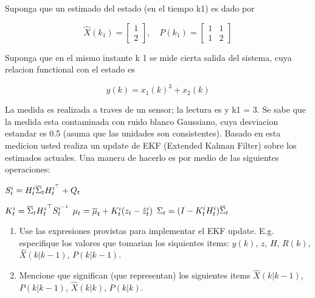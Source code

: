 \documentclass[parcial]{lcc}
\begin{document}
Suponga que un estimado del estado (en el tiempo k1) es dado por

\[ \hat{X}(k_1) = \begin{bmatrix} 1 \\ 2 \end{bmatrix}, \quad P(k_1) = \begin{bmatrix} 1 & 1 \\ 1 & 2 \end{bmatrix} \]

Suponga que en el mismo instante k 1 se mide cierta salida del sistema, cuya relacion functional con el estado es

\begin{equation*}
y(k) = x_1(k)^3 + x_2(k)
\end{equation*}

La medida es realizada a traves de un sensor; la lectura es y k1 = 3. Se sabe que la medida esta contaminada con ruido blanco Gaussiano, cuya desviacion estandar es 0.5 (asuma que las unidades son consistentes). Basado en esta medicion usted realiza un update de EKF (Extended Kalman Filter)  sobre los estimados actuales. Una manera de hacerlo es por medio de las siguientes operaciones:

    \begin{algorithmic}[1]
        \State $S_{t}^{i} = H_{t}^{i} \overline{\Sigma}_{t} H_{t}^{i^{\top}} + Q_{t} $

        \State $K_{t}^{i} = \overline{\Sigma}_{t} {H_{t}^{i}}^{\top} S_{t}^{i^{-1}} $
        \State $\mu_{t} = \overline{\mu}_{t} + K_{t}^{i}(z_{t} - \hat{z}_{t}^{i})$
        \State $\Sigma_{t} = (I - K_{t}^{i}H_{t}^{i})\overline{\Sigma}_{t}$
    \end{algorithmic}

    \begin{enumerate}
        \item Use las expresiones provistas para implementar el EKF update. E.g. especifique los valores que tomarian los siquientes items: $y(k)$, $z$, $H$, $R(k)$, $\hat{X}(k|k-1)$, $P(k|k-1)$.
        \item Mencione que significan (que representan) los siguientes items $\hat{X}(k|k-1)$, $P(k|k-1)$, $\hat{X}(k|k)$, $P(k|k)$.
    \end{enumerate}
\end{document}
